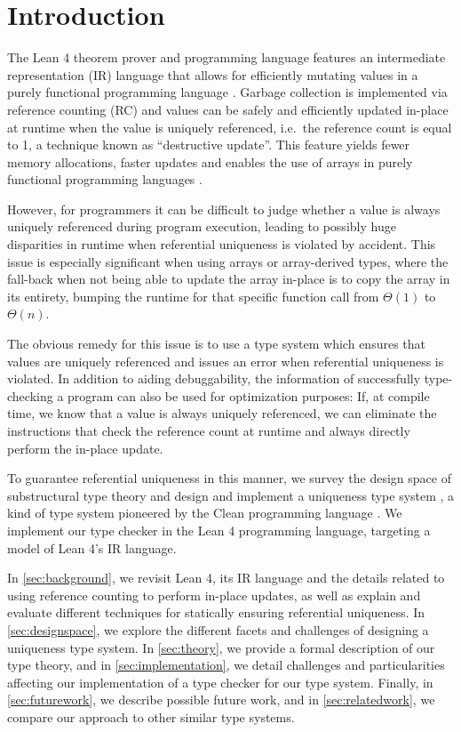 \chapter{Introduction}\label{sec:intro}

The Lean 4 theorem prover and programming language \citep{de_moura_lean_2021} features an intermediate representation (IR) language that allows for efficiently mutating values in a purely functional programming language \citep{ullrich_counting_2020}. Garbage collection is implemented via reference counting (RC) and values can be safely and efficiently updated in-place at runtime when the value is uniquely referenced, i.e.\ the reference count is equal to 1, a technique known as ``destructive update''. This feature yields fewer memory allocations, faster updates and enables the use of arrays in purely functional programming languages \citep{ullrich_counting_2020}.

However, for programmers it can be difficult to judge whether a value is always uniquely referenced during program execution, leading to possibly huge disparities in runtime when referential uniqueness is violated by accident. This issue is especially significant when using arrays or array-derived types, where the fall-back when not being able to update the array in-place is to copy the array in its entirety, bumping the runtime for that specific function call from $\Theta(1)$ to $\Theta(n)$.

The obvious remedy for this issue is to use a type system which ensures that values are uniquely referenced and issues an error when referential uniqueness is violated. In addition to aiding debuggability, the information of successfully type-checking a program can also be used for optimization purposes: If, at compile time, we know that a value is always uniquely referenced, we can eliminate the instructions that check the reference count at runtime and always directly perform the in-place update.

To guarantee referential uniqueness in this manner, we survey the design space of substructural type theory and design and implement a uniqueness type system \citep{sergey_linearity_2022}, a kind of type system pioneered by the Clean programming language \citep{smetsers_guaranteeing_1994}. We implement our type checker in the Lean 4 programming language, targeting a model of Lean 4's IR language.

In \cref{sec:background}, we revisit Lean 4, its IR language and the details related to using reference counting to perform in-place updates, as well as explain and evaluate different techniques for statically ensuring referential uniqueness. In \cref{sec:designspace}, we explore the different facets and challenges of designing a uniqueness type system. In \cref{sec:theory}, we provide a formal description of our type theory, and in \cref{sec:implementation}, we detail challenges and particularities affecting our implementation of a type checker for our type system. Finally, in \cref{sec:futurework}, we describe possible future work, and in \cref{sec:relatedwork}, we compare our approach to other similar type systems.